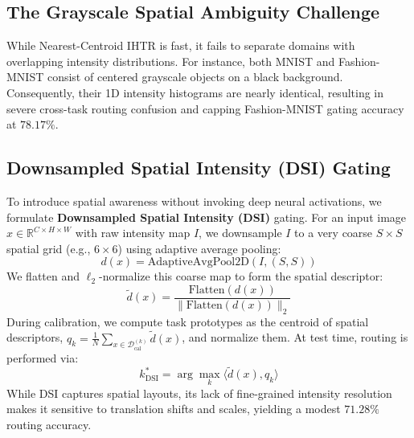 \documentclass{article}
\theoremstyle{plain}
\theoremstyle{definition}
\theoremstyle{remark}
\begin{document}
\subsection{The Grayscale Spatial Ambiguity Challenge}
While Nearest-Centroid IHTR is fast, it fails to separate domains with overlapping intensity distributions. For instance, both MNIST and Fashion-MNIST consist of centered grayscale objects on a black background. Consequently, their 1D intensity histograms are nearly identical, resulting in severe cross-task routing confusion and capping Fashion-MNIST gating accuracy at $78.17\%$.

\subsection{Downsampled Spatial Intensity (DSI) Gating}
To introduce spatial awareness without invoking deep neural activations, we formulate \textbf{Downsampled Spatial Intensity (DSI)} gating. For an input image $x \in \mathbb{R}^{C \times H \times W}$ with raw intensity map $I$, we downsample $I$ to a very coarse $S \times S$ spatial grid (e.g., $6 \times 6$) using adaptive average pooling:
\begin{equation}
    d(x) = \text{AdaptiveAvgPool2D}(I, (S, S))
\end{equation}
We flatten and $\ell_2$-normalize this coarse map to form the spatial descriptor:
\begin{equation}
    \tilde{d}(x) = \frac{\text{Flatten}(d(x))}{\|\text{Flatten}(d(x))\|_2}
\end{equation}
During calibration, we compute task prototypes as the centroid of spatial descriptors, $q_k = \frac{1}{N} \sum_{x \in \mathcal{D}_{\text{cal}}^{(k)}} \tilde{d}(x)$, and normalize them. At test time, routing is performed via:
\begin{equation}
    k^*_{\text{DSI}} = \arg\max_k \langle \tilde{d}(x), q_k \rangle
\end{equation}
While DSI captures spatial layouts, its lack of fine-grained intensity resolution makes it sensitive to translation shifts and scales, yielding a modest $71.28\%$ routing accuracy.
\end{document}
